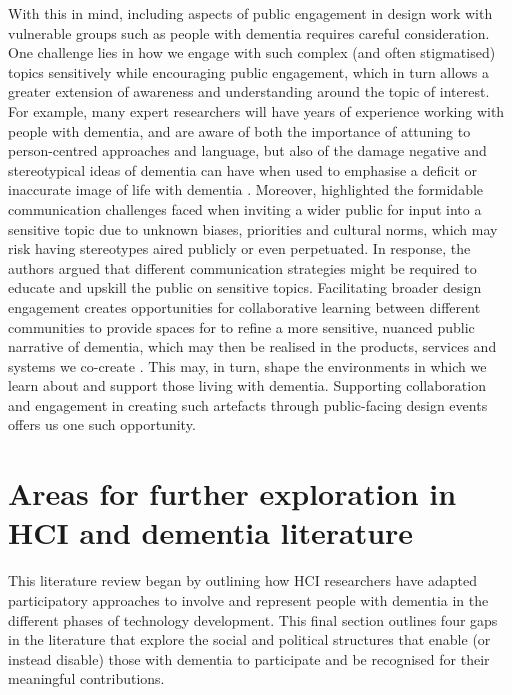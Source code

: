 With this in mind, including aspects of public engagement in design work with vulnerable groups such as people with dementia requires careful consideration. One challenge lies in how we engage with such complex (and often stigmatised) topics sensitively while encouraging public engagement, which in turn allows a greater extension of awareness and understanding around the topic of interest. For example, many expert researchers will have years of experience working with people with dementia, and are aware of both the importance of attuning to person-centred approaches \citep{fazio_fundamentals_2018} and language, but also of the damage negative and stereotypical ideas of dementia can have when used to emphasise a deficit or inaccurate image of life with dementia \citep{young_expanding_2019}. Moreover, \cite{niederdeppe2008message} highlighted the formidable communication challenges faced when inviting a wider public for input into a sensitive topic due to unknown biases, priorities and cultural norms, which may risk having stereotypes aired publicly or even perpetuated. In response, the authors argued that different communication strategies might be required to educate and upskill the public on sensitive topics. Facilitating broader design engagement creates opportunities for collaborative learning between different communities to provide spaces for to refine a more sensitive, nuanced public narrative of dementia, which may then be realised in the products, services and systems we co-create \citep{costanza-chock_design_2020}. This may, in turn, shape the environments in which we learn about and support those living with dementia. Supporting collaboration and engagement in creating such artefacts through public-facing design events offers us one such opportunity. 

\section{Areas for further exploration in HCI and dementia literature}
\label{BL:Missing-gaps}
This literature review began by outlining how HCI researchers have adapted participatory approaches to involve and represent people with dementia in the different phases of technology development. This final section outlines four gaps in the literature that explore the social and political structures that enable (or instead disable) those with dementia to participate and be recognised for their meaningful contributions. 

